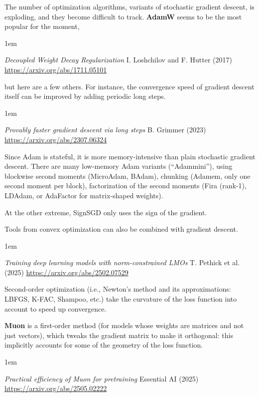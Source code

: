 \documentclass[a5paper]{article}
\let\d\textbf
\newenvironment{reference}{%
  \medskip\goodbreak
  \parskip 0pt
  \raggedright
  \leftskip 1em
  \obeylines
}{\par\medskip\goodbreak}
\begin{document}
The number of optimization algorithms, variants of stochastic gradient descent,
is exploding, and they become difficult to track.
\d{AdamW} seems to be the most popular for the moment,

\begin{reference}
  \emph{Decoupled Weight Decay Regularization}
  I. Loshchilov and F. Hutter (2017)
  \url{https://arxiv.org/abs/1711.05101}
\end{reference}

but here are a few others.
For instance, the convergence speed of gradient descent itself
can be improved by adding periodic long steps.

\begin{reference}
  \emph{Provably faster gradient descent via long steps}
  B. Grimmer (2023)
  \url{https://arxiv.org/abs/2307.06324}
\end{reference}

Since Adam is stateful, it is more memory-intensive than plain stochastic gradient descent.
There are many low-memory Adam variants (``Adammini''),
using blockwise second moments (MicroAdam, BAdam),
chunking (Adamem, only one second moment per block),
factorization of the second moments (Fira (rank-1), LDAdam, or AdaFactor for matrix-shaped weights).

At the other extreme, SignSGD only uses the sign of the gradient.

Tools from convex optimization can also be combined with gradient descent.

\begin{reference}
  \emph{Training deep learning models  with norm-constrained LMOs}
  T. Pethick et al. (2025)
  \url{https://arxiv.org/abs/2502.07529}
\end{reference}

Second-order optimization (i.e., Newton's method and its approximations:
LBFGS, K-FAC, Shampoo, etc.) take the curvature of the loss function into account
to speed up convergence.

\d{Muon} is a first-order method (for models whose weights are matrices and not just vectors),
which tweaks the gradient matrix to make it orthogonal: this implicitly accounts for
some of the geometry of the loss function.

\begin{reference}
  \emph{Practical efficiency of Muon for pretraining}
  Essential AI (2025)
  \url{https://arxiv.org/abs/2505.02222}
\end{reference}
\end{document}
